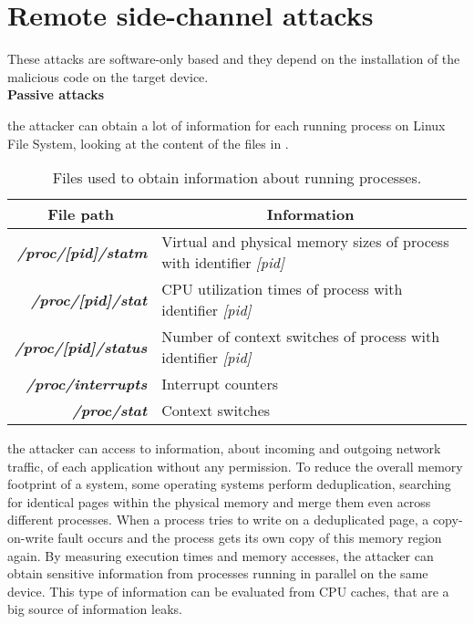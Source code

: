 \section{Remote side-channel attacks}\label{sideCH:remote}
These attacks are software-only based and they depend on the installation of the malicious code on the target device.\\
\textbf{Passive attacks}
\begin{itemize}
{the attacker can obtain a lot of information for each running process on Linux File System, looking at the content of the files in .
\begin{table}[H]
\centering \footnotesize
\renewcommand*\arraystretch{1.3}
\begin{tabular}{rl}
\toprule
\multicolumn{1}{c}{\textbf{File path}} & \multicolumn{1}{c}{\textbf{Information}}\\
\midrule
{\textbf{\textit{/proc/[pid]/statm}}} & {Virtual and physical memory sizes of process with identifier \textit{[pid]}}\\
{\textbf{\textit{/proc/[pid]/stat}}} & {CPU utilization times of process with identifier \textit{[pid]}}\\
{\textbf{\textit{/proc/[pid]/status}}} & {Number of context switches of process with identifier \textit{[pid]}}\\
{\textbf{\textit{/proc/interrupts}}} & {Interrupt counters}\\
{\textbf{\textit{/proc/stat}}} & {Context switches}\\
\bottomrule
\end{tabular}
\caption{\footnotesize{Files used to obtain information about running processes.}}
\label{sc:proc}
\end{table}
}
{the attacker can access to information, about incoming and outgoing network traffic, of each application without any permission.}
{To reduce the overall memory footprint of a system, some operating systems perform deduplication, searching for identical pages within the physical memory and merge them even across different processes. When a process tries to write on a deduplicated page, a copy-on-write fault occurs and the process gets its own copy of this memory region again.}
{By measuring execution times and memory accesses, the attacker can obtain sensitive information from processes running in parallel on the same device. This type of information can be evaluated from CPU caches, that are a big source of information leaks.}

\end{itemize}

